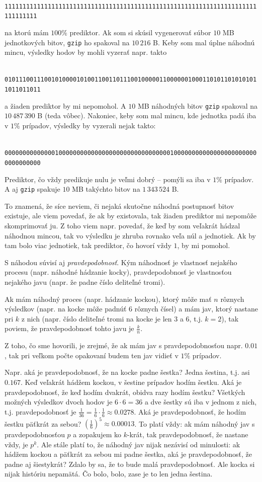 \documentclass[10pt]{article}
\def\ods{\vspace*{10pt}}
\begin{document}
{\ods
\centerline{{\tt 
1111111111111111111111111111111111111111111111111111111111111111111111111111111}}

\ods
na ktorú mám $100\%$ prediktor. Ak som si skúsil vygenerovať súbor $10$ MB jednotkových bitov,
{\tt gzip} ho spakoval na $10\,216$ B. Keby som mal úplne náhodnú mincu, výsledky hodov by
mohli vyzerať napr. takto

\ods
\centerline{{\tt
01011100111001010000101001100110111001000001100000010001101011010101011011011011}}

\ods
a žiaden prediktor by mi nepomohol. A $10$ MB náhodných bitov {\tt gzip} spakoval na
$10\,487\,390$  B (teda vôbec). Nakoniec, keby som mal mincu, kde jednotka padá iba v $1\%$
prípadov, výsledky by vyzerali nejak takto:

\ods
\centerline{{\tt 
00000000000000100000000000000000000000000000001000000000000000000000000000000000}}

\ods
Prediktor, čo vždy predikuje nulu je veľmi dobrý -- pomýli sa iba v $1\%$ prípadov. 
A aj {\tt gzip} spakuje $10$ MB takýchto bitov na $1\,343\,524$ B.

\ods
To znamená, že síce neviem, či nejaká skutočne náhodná postupnosť bitov 
existuje, ale viem povedať, že ak by existovala, tak žiaden prediktor mi
nepomôže skomprimovať
ju.
Z toho viem napr. povedať, že keď by som veľakrát hádzal náhodnou mincou, 
tak vo výsledku je zhruba rovnako
veľa núl a jednotiek. Ak by tam bolo viac jednotiek, tak prediktor, čo hovorí vždy $1$,
by mi pomohol.

\ods
S náhodou súvisí aj {\em pravdepodobnosť}. Kým náhodnosť je vlastnosť nejakého procesu
(napr. náhodné hádzanie kocky), pravdepodobnosť je vlastnosťou nejakého javu (napr. že 
padne číslo deliteľné tromi). 

\ods
Ak mám náhodný proces (napr. hádzanie kockou), 
ktorý môže mať $n$ rôznych výsledkov (napr. na kocke môže 
padnúť $6$ rôznych čísel) a mám jav, ktorý nastane pri $k$ z nich (napr. číslo deliteľné 
tromi na kocke je len $3$ a $6$, t.j. $k=2$), tak poviem, že pravdepodobnosť tohto javu je
$\frac{k}{n}$.

\ods 
Z toho, čo sme hovorili, je zrejmé, že ak mám jav s pravdepodobnosťou napr. $0.01$,
tak pri veľkom počte opakovaní budem ten jav vidieť v $1\%$ prípadov.

\ods
Napr. aká je pravdepodobnosť, že na kocke padne šestka? Jedna šestina, t.j. asi $0.167$. 
Keď veľakrát hádžem kockou,
v šestine prípadov hodím šestku. Aká je pravdepodobnosť, že keď hodím 
dvakrát, obidva razy hodím šestku?
Všetkých možných výsledkov dvoch hodov je $6\cdot 6=36$ a dve šestky sú iba v jednom 
z nich, t.j. pravdepodobnosť je $\frac{1}{36}=\frac{1}{6}\cdot\frac{1}{6}\approx0.0278$. 
Aká je pravdepodobnosť, že hodím šestku päťkrát za sebou? 
$\left(\frac{1}{6}\right)^5\approx0.00013$.
To platí vždy: ak mám náhodný jav s pravdepodobnosťou
$p$ a zopakujem ko $k$-krát, tak pravdepodobnosť, že nastane vždy, je $p^k$.
Ale stále platí to, že náhodný jav nijak nezávisí od minulosti: ak hádžem kockou 
a päťkrát za sebou mi padne šestka, aká je pravdepodobnosť, že padne aj šiestykrát?
Zdalo by sa, že to bude malá pravdepodobnosť. Ale kocka si nijak históriu nepamätá.
Čo bolo, bolo, zase je to len jedna šestina.


}
\end{document}
